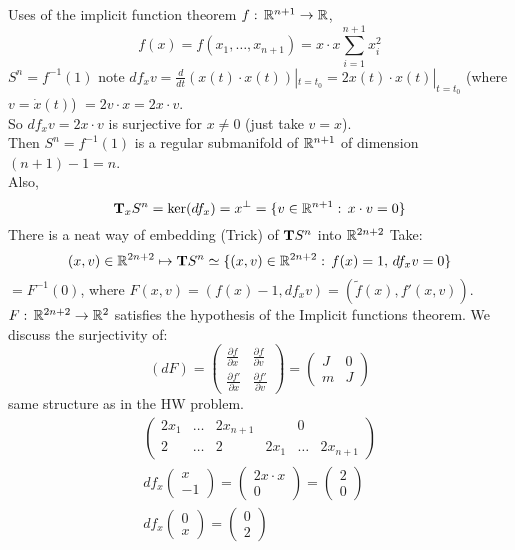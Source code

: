 \begin{examples}
Uses of the implicit function theorem $f:\, \mathbb{R}^{n+1} \to \mathbb{R}$, 
$$f(x)=f(x_1,\ldots, x_{n+1})=x\cdot x \sum_{i=1}^{n+1} x_i^2$$
$S^n=f ^{-1} (1)$ note $df_xv = \frac{d}{dt}(x(t)\cdot x(t))|_{t=t_0} = 2x(t)\cdot x(t)|_{t=t_0}$ (where $v=\dot x(t)$) $=2v\cdot x=2x\cdot v$.\\
So $df_xv=2x\cdot v$ is surjective for $x\neq 0$ (just take $v=x$).\\
Then $S^n= f ^{-1} (1)$ is a regular submanifold of $\mathbb{R}^{n+1}$ of dimension $(n+1) - 1=n$.\\
Also, $$\text{\textbf{T}}_xS^n= \ker (df_x)=x^\perp=\{v\in \mathbb{R}^{n+1} :\, x\cdot v=0 \}$$ There is a neat way of embedding (Trick) of $\text{\textbf{T}} S^n$ into $\mathbb{R}^{2n+2}$
Take:
$$(x,v) \in \mathbb{R}^{2n+2} \mapsto \text{\textbf{T}} S^n \simeq \{(x,v) \in \mathbb{R}^{2n+2}:\, f(x)=1, \, df_xv=0 \}$$
$=F ^{-1} (0)$, where $F(x,v)=(f(x)-1, df_xv) = (\tilde f(x), f'(x,v))$.\\
$F:\,  \mathbb{R}^{2n+2}   \to \mathbb{R}^2$ satisfies the hypothesis of the Implicit functions theorem. We discuss the surjectivity of:
$$(dF)= \left( \begin{array}{c|c} \frac{\partial f}{\partial x} & \frac{\partial f}{\partial v} \\\hline \frac{\partial f'}{\partial x} & \frac{\partial f'}{\partial v} \end{array} \right)= \begin{pmatrix} J& 0 \\ m & J \end{pmatrix}$$
same structure as in the HW problem.
\begin{gather*}
\left(\begin{array}{ccc|ccc}
2x_1 & \ldots & 2x_{n+1} & & 0 & \\
2 & \ldots & 2 & 2x_1 & \ldots & 2x_{n+1}
\end{array} \right)\\
df_x\begin{pmatrix} x\\-1 \end{pmatrix} = \begin{pmatrix} 2x\cdot x \\0 \end{pmatrix}=\begin{pmatrix} 2  \\0 \end{pmatrix}\\
df_x\begin{pmatrix} 0\\x \end{pmatrix} = \begin{pmatrix} 0\\2 \end{pmatrix} 

\end{gather*}
\end{examples}
